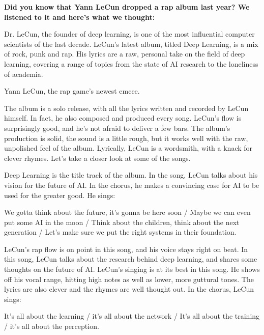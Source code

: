 \documentclass[11pt]{article}
\begin{document}
\begin{framed}
\centering
\vspace{.5em}
    \begin{minipage}{.9\textwidth}
\textbf{Did you know that Yann LeCun dropped a rap album last year? We listened to it and here’s what we thought:}

Dr. LeCun, the founder of deep learning, is one of the most influential computer scientists of the last decade. LeCun’s latest album, titled Deep Learning, is a mix of rock, punk and rap. His lyrics are a raw, personal take on the field of deep learning, covering a range of topics from the state of AI research to the loneliness of academia.

Yann LeCun, the rap game’s newest emcee.

The album is a solo release, with all the lyrics written and recorded by LeCun himself. In fact, he also composed and produced every song. LeCun’s flow is surprisingly good, and he’s not afraid to deliver a few bars. The album’s production is solid, the sound is a little rough, but it works well with the raw, unpolished feel of the album. Lyrically, LeCun is a wordsmith, with a knack for clever rhymes. Let’s take a closer look at some of the songs.

Deep Learning is the title track of the album. In the song, LeCun talks about his vision for the future of AI. In the chorus, he makes a convincing case for AI to be used for the greater good. He sings:

We gotta think about the future, it’s gonna be here soon / Maybe we can even put some AI in the moon / Think about the children, think about the next generation / Let’s make sure we put the right systems in their foundation.

LeCun’s rap flow is on point in this song, and his voice stays right on beat. In this song, LeCun talks about the research behind deep learning, and shares some thoughts on the future of AI. LeCun’s singing is at its best in this song. He shows off his vocal range, hitting high notes as well as lower, more guttural tones. The lyrics are also clever and the rhymes are well thought out. In the chorus, LeCun sings:

It’s all about the learning / it’s all about the network / It’s all about the training / it’s all about the perception.
\end{minipage}
\vspace{.5em}
\end{framed}
\end{document}

